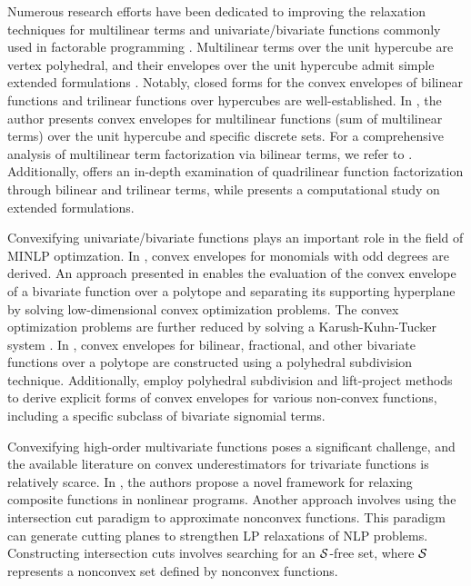 Numerous research efforts have been dedicated to improving the relaxation techniques for multilinear terms and univariate/bivariate functions commonly used in factorable programming \cite{bao2015global}. Multilinear terms over the unit hypercube  are vertex polyhedral, and  their envelopes over the unit hypercube admit simple extended formulations  \cite{rikun1997convex}. Notably, closed forms for the convex envelopes of bilinear functions \cite{al1983jointly, mccormick1976computability} and trilinear functions \cite{meyer2004trilinear, meyer20042} over hypercubes are well-established. In \cite{sherali1997convex}, the author presents convex envelopes for multilinear functions (sum of multilinear terms) over the unit hypercube and specific discrete sets. For a comprehensive analysis of multilinear term factorization via bilinear terms, we refer to \cite{luedtke2012some, speakman2017quantifying}. Additionally, \cite{cafieri2010convex} offers an in-depth examination of quadrilinear function factorization through bilinear and trilinear terms, while \cite{costa2012relaxations} presents a computational study on extended formulations.

Convexifying univariate/bivariate functions plays an important role in the field of MINLP optimzation. In \cite{liberti2003convex}, convex envelopes for monomials with odd degrees are derived. An approach presented in \cite{locatelli2014convex} enables the evaluation of the convex envelope of a bivariate function over a polytope and separating its supporting hyperplane by solving low-dimensional convex optimization problems. The convex optimization problems are further reduced by solving a Karush-Kuhn-Tucker system \cite{locatelli2018convex}. In \cite{locatelli2016polyhedral}, convex envelopes for bilinear, fractional, and other bivariate functions over a polytope are constructed using a polyhedral subdivision technique. Additionally, \cite{nguyen2018deriving, tawarmalani2013explicit} employ polyhedral subdivision and lift-project methods to derive explicit forms of convex envelopes for various non-convex functions, including a specific subclass of bivariate signomial terms.

Convexifying high-order multivariate functions poses a significant challenge, and the available literature on convex underestimators for trivariate functions is relatively scarce. In \cite{he2021new, he2022tractable}, the authors propose a novel framework for relaxing composite functions in nonlinear programs. Another approach involves using the intersection cut paradigm \cite{conforti2011} to approximate nonconvex functions. This paradigm can generate cutting planes to strengthen LP relaxations of NLP problems. Constructing intersection cuts involves searching for an $\mathcal S$-free set, where $\mathcal S$ represents a nonconvex set defined by nonconvex functions.

